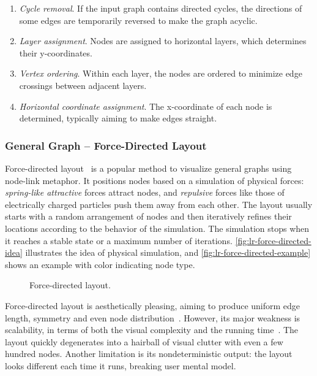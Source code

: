 \begin{enumerate}
	\item \emph{Cycle removal}. If the input graph contains directed cycles, the directions of some edges are temporarily reversed to make the graph acyclic.
	\item \emph{Layer assignment}. Nodes are assigned to horizontal layers, which determines their y-coordinates.
	\item \emph{Vertex ordering}. Within each layer, the nodes are ordered to minimize edge crossings between adjacent layers.
	\item \emph{Horizontal coordinate assignment}. The x-coordinate of each node is determined, typically aiming to make edges straight.
\end{enumerate}

\subsubsection{General Graph -- Force-Directed Layout}
Force-directed layout~\cite{Eades1984} is a popular method to visualize general graphs using node-link metaphor. It positions nodes based on a simulation of physical forces: \emph{spring-like attractive} forces attract nodes, and \emph{repulsive} forces like those of electrically charged particles push them away from each other. The layout usually starts with a random arrangement of nodes and then iteratively refines their locations according to the behavior of the simulation. The simulation stops when it reaches a stable state or a maximum number of iterations. \autoref{fig:lr-force-directed-idea} illustrates the idea of physical simulation, and \autoref{fig:lr-force-directed-example} shows an example with color indicating node type.

\begin{figure}[!htb]
\centering
{}
\hspace{1cm}
\caption{Force-directed layout.}
\end{figure}

Force-directed layout is aesthetically pleasing, aiming to produce uniform edge length, symmetry and even node distribution~\cite{Fruchterman1991}. However, its major weakness is scalability, in terms of both the visual complexity and the running time~\cite{Munzner2014}. The layout quickly degenerates into a hairball of visual clutter with even a few hundred nodes. Another limitation is its nondeterministic output: the layout looks different each time it runs, breaking user mental model.

